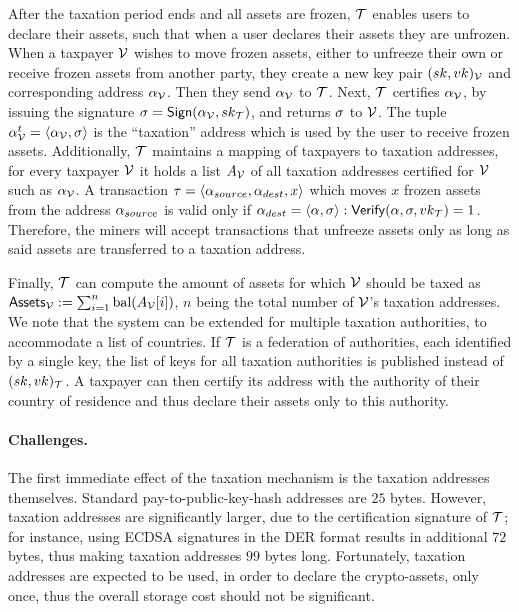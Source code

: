 After the taxation period ends and all assets are frozen, $\mathcal{T}$ enables
users to declare their assets, such that when a user declares their assets
they are unfrozen. When a taxpayer $\mathcal{V}$ wishes to move frozen assets, \ie
either to unfreeze their own or receive frozen assets from another party, they
create a new key pair $(sk, vk)_\mathcal{V}$ and corresponding address
$\alpha_\mathcal{V}$. Then they send $\alpha_\mathcal{V}$ to $\mathcal{T}$. Next,
$\mathcal{T}$ certifies $\alpha_\mathcal{V}$, by issuing the signature $\sigma =
\mathsf{Sign}(\alpha_\mathcal{V}, sk_\mathcal{T})$, and returns $\sigma$ to $\mathcal{V}$.
The tuple $\alpha_\mathcal{V}^{t} = \langle \alpha_\mathcal{V}, \sigma \rangle$ is the
``taxation'' address which is used by the user to receive frozen assets.
Additionally, $\mathcal{T}$ maintains a mapping of taxpayers to taxation
addresses, \ie for every taxpayer $\mathcal{V}$ it holds a list $A_\mathcal{V}$ of all
taxation addresses certified for $\mathcal{V}$ such as $\alpha_\mathcal{V}$.
A transaction $\tau = \langle \alpha_{source}, \alpha_{dest}, x \rangle$
which moves $x$ frozen assets from the address $\alpha_{source}$ is valid
only if $\alpha_{dest} = \langle \alpha, \sigma \rangle:
\mathsf{Verify}(\alpha, \sigma, vk_\mathcal{T}) = 1$. Therefore, the miners
will accept transactions that unfreeze assets only as long as said assets are
transferred to a taxation address.

Finally, $\mathcal{T}$ can compute the amount of assets for which $\mathcal{V}$ should
be taxed as $\mathsf{Assets}_\mathcal{V} := \sum_{i=1}^{n} \text{bal}(A_{\mathcal{V}}[i])$,
$n$ being the total number of $\mathcal{V}$'s taxation addresses. We note that the
system can be extended for multiple taxation authorities, \eg to accommodate a
list of countries. If $\mathcal{T}$ is a federation of authorities, each
identified by a single key, the list of keys for all taxation authorities is
published instead of $(sk, vk)_\mathcal{T}$. A taxpayer can then certify its
address with the authority of their country of residence and thus declare their
assets only to this authority.

\paragraph{Challenges.}

The first immediate effect of the taxation mechanism is the taxation addresses
themselves. Standard pay-to-public-key-hash
addresses are $25$ bytes.
However, taxation addresses are significantly larger, due to the certification
signature of $\mathcal{T}$; for instance, using ECDSA signatures in the DER format
results in additional $72$ bytes, thus making taxation addresses $99$ bytes
long. Fortunately, taxation addresses are expected to be used, in order to
declare the crypto-assets, only once, thus the overall storage cost should not
be significant.

